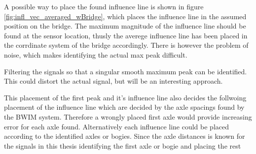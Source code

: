 % 		

% 		

A possible way to place the found influence line is shown in figure \ref{fig:infl_vec_averaged_wBridge}, which places the influence line in the assumed position on the bridge. The maximum magnitude of the influence line should be found at the sensor location, thusly the averege influence line has been placed in the corrdinate system of the bridge accordingly. There is however the problem of noise, which makes identifying the actual max peak difficult.

Filtering the signals so that a singular smooth maximum peak can be identified. This could distort the actual signal, but will be an interesting approach.

This placement of the first peak and it's influence line also decides the follwoing placement of the influence line which are decided by the axle spacings found by the BWIM system. Therefore a wrongly placed first axle would provide increasing error for each axle found.
Alternatively each influence line could be placed according to the identified axles or bogies. Since the axle distances is known for the signals in this thesis identifying the first axle or bogie and placing the rest
